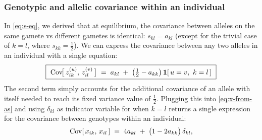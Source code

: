 \documentclass[12pt]{article}
\begin{document}
\subsubsection{Genotypic and allelic covariance within an individual}\label{sec:am-geno-within}
In \eqref{eq:s-eq}, we derived that at equilibrium, the covariance between alleles on the same gamete vs different gametes is identical: $s_{kl} = a_{kl}$ (except for the trivial case of $k = l$, where $s_{kk} = \tfrac12$).
We can express the covariance between any two alleles in an individual with a single equation:
\begin{equation}\label{eq:z-within}
    \boxed{\ \mathrm{Cov}\!\big[\,z^{(u)}_{ik},\, z^{(v)}_{il}\,\big] \;=\; a_{kl} \;+\; \big(\tfrac12 - a_{kk}\big)\,\mathbf{1}[\,u = v,\ k = l\,] \ }
\end{equation}
The second term simply accounts for the additional covariance of an allele with itself needed to reach its fixed variance value of $\tfrac12$.
Plugging this into \eqref{eq:x-from-as} and using $\delta_{kl}$ as indicator variable for when $k=l$ returns a single expression for the covariance between genotypes within an individual:
\begin{equation}\label{eq:x-within}
    \mathrm{Cov}[\,x_{ik},\, x_{il}\,] \;=\; 4a_{kl} \;+\; \big(1 - 2a_{kk}\big)\,\delta_{kl} ,
\end{equation}
\end{document}
